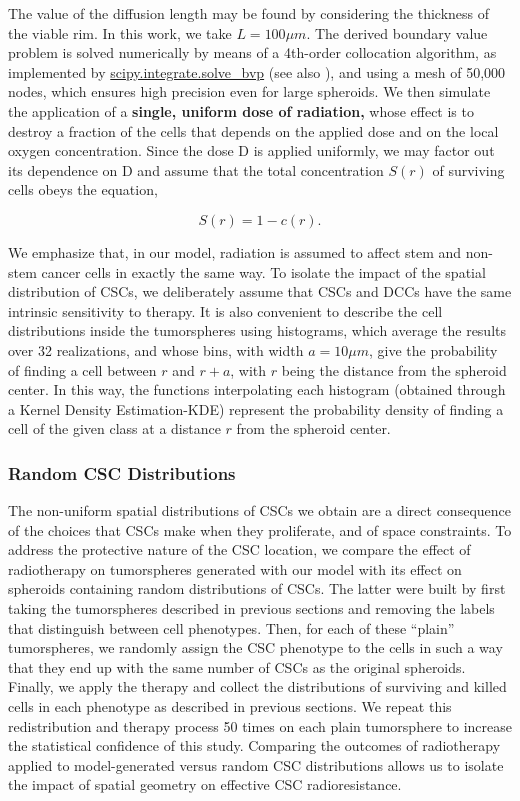 \documentclass[10pt,letterpaper]{article}
\begin{document}
The value of the diffusion length may be found by considering the thickness of the viable rim. In this work, we take $L=100 \mu m$. The derived boundary value problem is solved numerically by means of a 4th-order collocation algorithm, as implemented by \href{https://docs.scipy.org/doc/scipy/reference/generated/scipy.integrate.solve_bvp.html#id4}{scipy.integrate.solve\_bvp} (see also \cite{2020SciPy-NMeth}), and using a mesh of 50,000 nodes, which ensures high precision even for large spheroids. 
We then simulate the application of a {\bf single, uniform dose of radiation,} whose effect is to destroy a fraction of the cells that depends on the applied dose and on the local oxygen concentration. Since the dose D is applied uniformly, we may factor out its dependence on D and assume that the total concentration $S(r)$ of surviving cells obeys the equation,

\begin{equation}
	S(r) = 1- c(r). 
\end{equation}

We emphasize that, in our model, radiation is assumed to affect stem and non-stem cancer cells in exactly the same way. To isolate the impact of the spatial distribution of CSCs, we deliberately assume that CSCs and DCCs have the same intrinsic sensitivity to therapy. It is also convenient to describe the cell distributions inside the tumorspheres using histograms, which average the results over 32 realizations, and whose bins, with width  $a = 10 \mu m$, give the probability of finding a cell between $r$ and $r+a$, with $r$ being the distance from the spheroid center. In this way, the functions interpolating each histogram (obtained through a Kernel Density Estimation-KDE) represent the probability density of finding a cell of the given class at a distance $r$ from the spheroid center. 


\subsubsection*{Random CSC Distributions}
The non-uniform spatial distributions of CSCs we obtain are a direct consequence of the choices that CSCs make when they proliferate, and of space constraints. To address the protective nature of the CSC location, we compare the effect of radiotherapy on tumorspheres generated with our model with its effect on spheroids containing random distributions of CSCs. The latter were built by first taking the tumorspheres described in previous sections and removing the labels that distinguish between cell phenotypes. Then, for each of these ``plain'' tumorspheres, we randomly assign the CSC phenotype to the cells in such a way that they end up with the same number of CSCs as the original spheroids. Finally, we apply the therapy and collect the distributions of surviving and killed cells in each phenotype as described in previous sections. We repeat this redistribution and therapy process 50 times on each plain tumorsphere to increase the statistical confidence of this study. Comparing the outcomes of radiotherapy applied to model-generated versus random CSC distributions allows us to isolate the impact of spatial geometry on effective CSC radioresistance.
\end{document}
